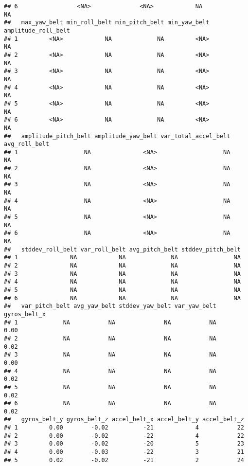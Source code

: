 \documentclass[
]{article}
\begin{document}
\begin{verbatim}
## 6                 <NA>              <NA>            NA             NA
##   max_yaw_belt min_roll_belt min_pitch_belt min_yaw_belt amplitude_roll_belt
## 1         <NA>            NA             NA         <NA>                  NA
## 2         <NA>            NA             NA         <NA>                  NA
## 3         <NA>            NA             NA         <NA>                  NA
## 4         <NA>            NA             NA         <NA>                  NA
## 5         <NA>            NA             NA         <NA>                  NA
## 6         <NA>            NA             NA         <NA>                  NA
##   amplitude_pitch_belt amplitude_yaw_belt var_total_accel_belt avg_roll_belt
## 1                   NA               <NA>                   NA            NA
## 2                   NA               <NA>                   NA            NA
## 3                   NA               <NA>                   NA            NA
## 4                   NA               <NA>                   NA            NA
## 5                   NA               <NA>                   NA            NA
## 6                   NA               <NA>                   NA            NA
##   stddev_roll_belt var_roll_belt avg_pitch_belt stddev_pitch_belt
## 1               NA            NA             NA                NA
## 2               NA            NA             NA                NA
## 3               NA            NA             NA                NA
## 4               NA            NA             NA                NA
## 5               NA            NA             NA                NA
## 6               NA            NA             NA                NA
##   var_pitch_belt avg_yaw_belt stddev_yaw_belt var_yaw_belt gyros_belt_x
## 1             NA           NA              NA           NA         0.00
## 2             NA           NA              NA           NA         0.02
## 3             NA           NA              NA           NA         0.00
## 4             NA           NA              NA           NA         0.02
## 5             NA           NA              NA           NA         0.02
## 6             NA           NA              NA           NA         0.02
##   gyros_belt_y gyros_belt_z accel_belt_x accel_belt_y accel_belt_z
## 1         0.00        -0.02          -21            4           22
## 2         0.00        -0.02          -22            4           22
## 3         0.00        -0.02          -20            5           23
## 4         0.00        -0.03          -22            3           21
## 5         0.02        -0.02          -21            2           24

\end{verbatim}
\end{document}
